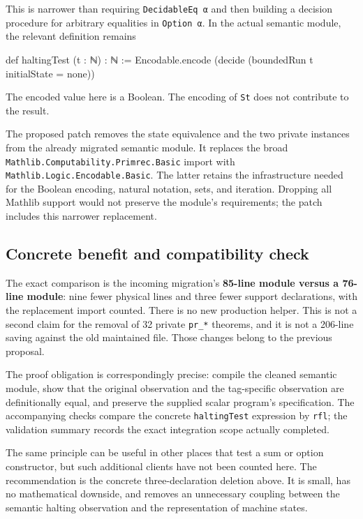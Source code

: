 \documentclass[11pt,a4paper]{article}
\newcommand{\code}[1]{\texttt{#1}}
\begin{document}
This is narrower than requiring \code{DecidableEq α} and then building a decision procedure for arbitrary equalities in \code{Option α}. In the actual semantic module, the relevant definition remains
\begin{Lean}
def haltingTest (t : ℕ) : ℕ :=
  Encodable.encode (decide (boundedRun t initialState = none))
\end{Lean}
The encoded value here is a Boolean. The encoding of \code{St} does not contribute to the result.

The proposed patch removes the state equivalence and the two private instances from the already migrated semantic module. It replaces the broad \code{Mathlib.Computability.Primrec.Basic} import with \code{Mathlib.Logic.Encodable.Basic}. The latter retains the infrastructure needed for the Boolean encoding, natural notation, sets, and iteration. Dropping all Mathlib support would not preserve the module's requirements; the patch includes this narrower replacement.

\subsection{Concrete benefit and compatibility check}

The exact comparison is the incoming migration's \textbf{85-line module versus a 76-line module}: nine fewer physical lines and three fewer support declarations, with the replacement import counted. There is no new production helper. This is not a second claim for the removal of 32 private \code{pr\_*} theorems, and it is not a 206-line saving against the old maintained file. Those changes belong to the previous proposal.

The proof obligation is correspondingly precise: compile the cleaned semantic module, show that the original observation and the tag-specific observation are definitionally equal, and preserve the supplied scalar program's specification. The accompanying checks compare the concrete \code{haltingTest} expression by \code{rfl}; the validation summary records the exact integration scope actually completed.

The same principle can be useful in other places that test a sum or option constructor, but such additional clients have not been counted here. The recommendation is the concrete three-declaration deletion above. It is small, has no mathematical downside, and removes an unnecessary coupling between the semantic halting observation and the representation of machine states.
\end{document}
